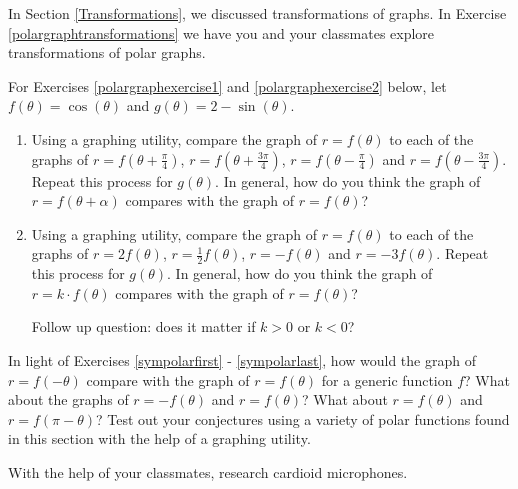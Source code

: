 \documentclass{ximera}
\begin{document}
\begin{question}
In Section \ref{Transformations}, we discussed transformations of graphs.   In Exercise \ref{polargraphtransformations} we have you and your classmates explore transformations of polar graphs. 

\begin{problem} \label{polargraphtransformations}
For Exercises \ref{polargraphexercise1} and \ref{polargraphexercise2} below, let  $f(\theta) = \cos(\theta)$ and $g(\theta) = 2-\sin(\theta)$. 

\begin{enumerate}

\item  \label{polargraphexercise1} Using a graphing utility, compare the graph of $r = f(\theta)$ to each of the graphs of $r = f\left(\theta  + \frac{\pi}{4}\right)$, $r = f\left(\theta  + \frac{3\pi}{4}\right)$, $r = f\left(\theta  - \frac{\pi}{4}\right)$ and $r = f\left(\theta  - \frac{3\pi}{4}\right)$.  Repeat this process for $g(\theta)$.  In general, how do you think the graph of $r = f(\theta + \alpha)$ compares with the graph of $r = f(\theta)$?


\item \label{polargraphexercise2} Using a graphing utility, compare the graph of $r = f(\theta)$ to each of the graphs of $r = 2f\left(\theta\right)$, $r = \frac{1}{2} f\left(\theta\right)$, $r = -f\left(\theta\right)$ and $r = -3 f(\theta)$.  Repeat this process for $g(\theta)$.  In general, how do you think the graph of $r = k \cdot f(\theta)$ compares with the graph of $r = f(\theta)$? 

Follow up question:  does it matter if $k>0$ or $k<0$?

\end{enumerate}

\end{problem}

\end{question}

\begin{problem}
In light of Exercises \ref{sympolarfirst} - \ref{sympolarlast}, how would the graph of $r = f(-\theta)$ compare with the graph of $r = f(\theta)$ for a generic function $f$?  What about the graphs of $r = -f(\theta)$ and $r = f(\theta)$?  What about $r = f(\theta)$ and $r = f(\pi - \theta)$?  Test out your conjectures using a variety of polar functions found in this section with the help of a graphing utility.
\end{problem}

\begin{problem}
With the help of your classmates, research cardioid microphones.
\end{problem}

\end{document}
